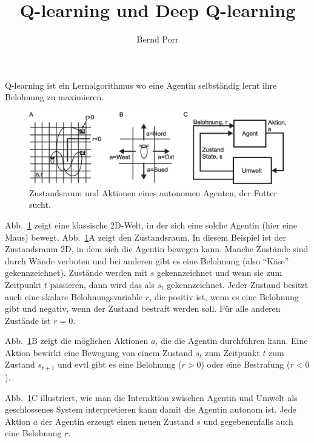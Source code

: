 \documentclass[12pt]{report}
\author{Bernd Porr}
\title{Q-learning und Deep Q-learning}
\begin{document}
\maketitle

Q-learning ist ein Lernalgorithmus wo eine Agentin selbständig
lernt ihre Belohnung zu maximieren.

\begin{figure}[!hbt]
\begin{center}
\mbox{\includegraphics[width=\textwidth]{state_action}}
\end{center}
\caption{Zustandsraum und Aktionen eines autonomen Agenten,
  der Futter sucht.
\label{state_action}}
\end{figure}

Abb.~\ref{state_action} zeigt eine klassische 2D-Welt, in der sich
eine solche Agentin (hier eine Maus) bewegt. Abb.~\ref{state_action}A
zeigt den Zustandsraum. In diesem Beispiel ist der Zustandsraum 2D, in
dem sich die Agentin bewegen kann. Manche Zustände sind durch Wände
verboten und bei anderen gibt es eine Belohnung (also ``Käse''
gekennzeichnet).  Zustände werden mit $s$ gekennzeichnet und wenn sie
zum Zeitpunkt $t$ passieren, dann wird das als $s_t$
gekennzeichnet. Jeder Zustand besitzt auch eine skalare
Belohnungsvariable $r$, die positiv ist, wenn es eine Belohnung gibt
und negativ, wenn der Zustand bestraft werden soll. F\"ur alle anderen
Zustände ist $r=0$.

Abb.~\ref{state_action}B zeigt die möglichen Aktionen $a$, die die
Agentin durchführen kann. Eine Aktion bewirkt eine Bewegung von einem
Zustand $s_t$ zum Zeitpunkt $t$ zum Zustand $s_{t+1}$ und evtl gibt
es eine Belohnung ($r>0$) oder eine Bestrafung ($r<0$).

Abb.~\ref{state_action}C illustriert, wie man die Interaktion
zwischen Agentin und Umwelt als geschlossenes System interpretieren
kann damit die Agentin autonom ist. Jede Aktion $a$ der Agentin
erzeugt einen neuen Zustand $s$ und gegebenenfalls auch eine
Belohnung $r$.
\end{document}
